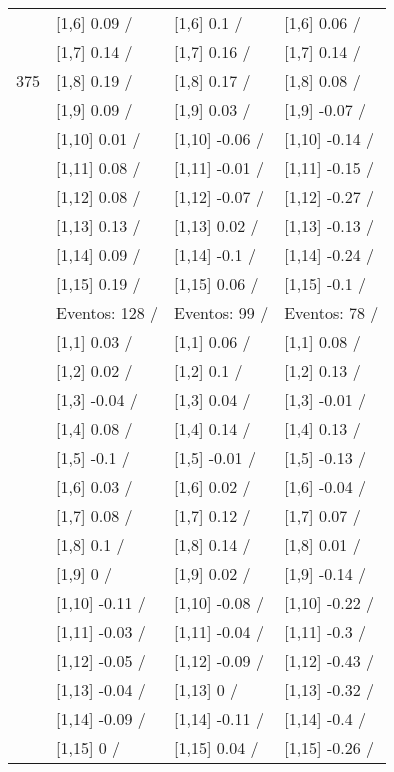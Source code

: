 \begin{table}
\begin{tabular}[t]{llll}
 & {}[1,6] 0.09  / & {}[1,6] 0.1  / & {}[1,6] 0.06  /\\
 & {}[1,7] 0.14  / & {}[1,7] 0.16  / & {}[1,7] 0.14  /\\
375 & {}[1,8] 0.19  / & {}[1,8] 0.17  / & {}[1,8] 0.08  /\\
\addlinespace
 & {}[1,9] 0.09  / & {}[1,9] 0.03  / & {}[1,9] -0.07  /\\
 & {}[1,10] 0.01  / & {}[1,10] -0.06  / & {}[1,10] -0.14  /\\
 & {}[1,11] 0.08  / & {}[1,11] -0.01  / & {}[1,11] -0.15  /\\
 & {}[1,12] 0.08  / & {}[1,12] -0.07  / & {}[1,12] -0.27  /\\
 & {}[1,13] 0.13  / & {}[1,13] 0.02  / & {}[1,13] -0.13  /\\
\addlinespace
 & {}[1,14] 0.09  / & {}[1,14] -0.1  / & {}[1,14] -0.24  /\\
 & {}[1,15] 0.19  / & {}[1,15] 0.06  / & {}[1,15] -0.1  /\\
 & Eventos:  128 / & Eventos:  99 / & Eventos:  78 /\\
 & {}[1,1] 0.03  / & {}[1,1] 0.06  / & {}[1,1] 0.08  /\\
 & {}[1,2] 0.02  / & {}[1,2] 0.1  / & {}[1,2] 0.13  /\\
\addlinespace
 & {}[1,3] -0.04  / & {}[1,3] 0.04  / & {}[1,3] -0.01  /\\
 & {}[1,4] 0.08  / & {}[1,4] 0.14  / & {}[1,4] 0.13  /\\
 & {}[1,5] -0.1  / & {}[1,5] -0.01  / & {}[1,5] -0.13  /\\
 & {}[1,6] 0.03  / & {}[1,6] 0.02  / & {}[1,6] -0.04  /\\
 & {}[1,7] 0.08  / & {}[1,7] 0.12  / & {}[1,7] 0.07  /\\
\addlinespace
500 & {}[1,8] 0.1  / & {}[1,8] 0.14  / & {}[1,8] 0.01  /\\
 & {}[1,9] 0  / & {}[1,9] 0.02  / & {}[1,9] -0.14  /\\
 & {}[1,10] -0.11  / & {}[1,10] -0.08  / & {}[1,10] -0.22  /\\
 & {}[1,11] -0.03  / & {}[1,11] -0.04  / & {}[1,11] -0.3  /\\
 & {}[1,12] -0.05  / & {}[1,12] -0.09  / & {}[1,12] -0.43  /\\
\addlinespace
 & {}[1,13] -0.04  / & {}[1,13] 0  / & {}[1,13] -0.32  /\\
 & {}[1,14] -0.09  / & {}[1,14] -0.11  / & {}[1,14] -0.4  /\\
 & {}[1,15] 0  / & {}[1,15] 0.04  / & {}[1,15] -0.26  /\\
\bottomrule
\end{tabular}
\end{table}

